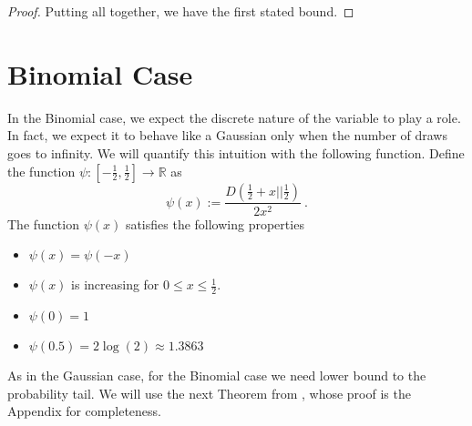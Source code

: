 \documentclass{article}
\newcommand{\field}[1]{\mathbb{#1}}
\newcommand{\R}{\field{R}}
\begin{document}
\begin{proof}
Putting all together, we have the first stated bound.
\end{proof}

\section{Binomial Case}
\label{section:maximum-of-random-walks}

In the Binomial case, we expect the discrete nature of the variable to play a role. In fact, we expect it to behave like a Gaussian only when the number of draws goes to infinity.
We will quantify this intuition with the following function.
Define the function $\psi:[-\frac{1}{2},\frac{1}{2}] \rightarrow \R$ as
\[
\psi(x):=\frac{D(\frac{1}{2}+x||\frac{1}{2})}{2 x^2}~.
\]
The function $\psi(x)$ satisfies the following properties
\begin{itemize}
\item $\psi(x)=\psi(-x)$
\item $\psi(x)$ is increasing for $0\leq x \leq\frac{1}{2}$.
\item $\psi(0)=1$
\item $\psi(0.5)=2 \log(2) \approx 1.3863$
\end{itemize}

As in the Gaussian case, for the Binomial case we need lower bound to the probability tail.
We will use the next Theorem from \cite{nOrabona13}, whose proof is the Appendix for completeness.
\end{document}
